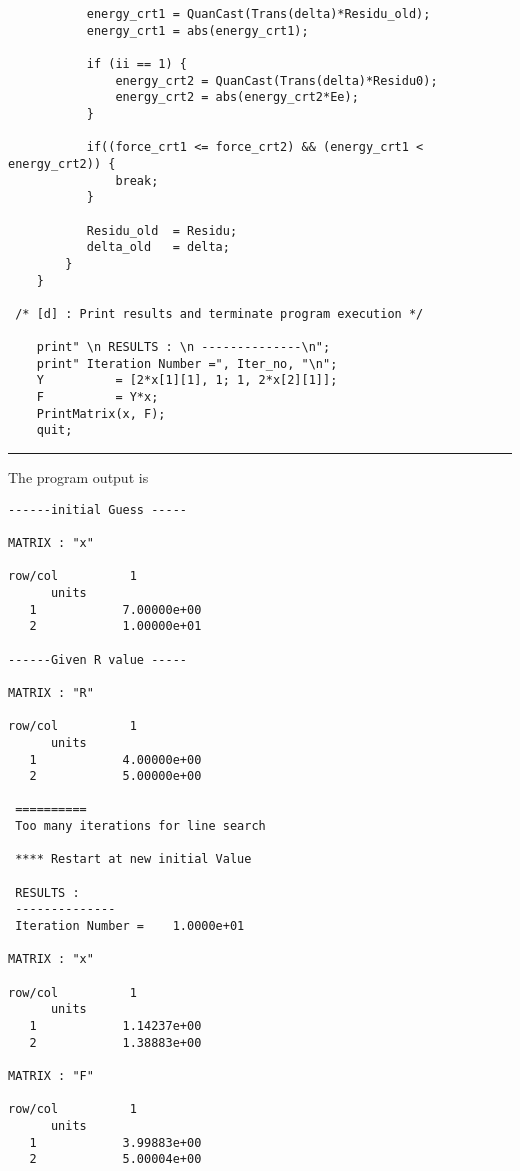 \begin{footnotesize}
\begin{verbatim}
           energy_crt1 = QuanCast(Trans(delta)*Residu_old);
           energy_crt1 = abs(energy_crt1);

           if (ii == 1) {
               energy_crt2 = QuanCast(Trans(delta)*Residu0);
               energy_crt2 = abs(energy_crt2*Ee);
           }

           if((force_crt1 <= force_crt2) && (energy_crt1 < energy_crt2)) {
               break;
           }

           Residu_old  = Residu;
           delta_old   = delta;
        }
    }

 /* [d] : Print results and terminate program execution */

    print" \n RESULTS : \n --------------\n";
    print" Iteration Number =", Iter_no, "\n";
    Y          = [2*x[1][1], 1; 1, 2*x[2][1]];
    F          = Y*x;
    PrintMatrix(x, F);
    quit;
\end{verbatim}
\rule{6.25 in}{0.035 in}
\end{footnotesize}

\vspace{0.1 in}\noindent
The program output is

\begin{footnotesize}
\begin{verbatim}
------initial Guess -----

MATRIX : "x"

row/col          1          
      units             
   1            7.00000e+00
   2            1.00000e+01

------Given R value -----

MATRIX : "R"

row/col          1          
      units             
   1            4.00000e+00
   2            5.00000e+00
 
 ========== 
 Too many iterations for line search 
 
 **** Restart at new initial Value 

 RESULTS :
 --------------
 Iteration Number =    1.0000e+01 

MATRIX : "x"

row/col          1          
      units             
   1            1.14237e+00
   2            1.38883e+00

MATRIX : "F"

row/col          1          
      units             
   1            3.99883e+00
   2            5.00004e+00
\end{verbatim}
\end{footnotesize}


